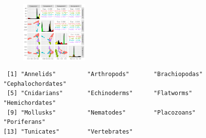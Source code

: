 \documentclass[
  letterpaper,
  DIV=11,
  numbers=noendperiod]{scrreprt}
\newenvironment{Shaded}{\begin{snugshade}}{\end{snugshade}}
\newcommand{\FunctionTok}[1]{\textcolor[rgb]{0.28,0.35,0.67}{#1}}
\newcommand{\NormalTok}[1]{\textcolor[rgb]{0.00,0.23,0.31}{#1}}
\newcommand{\OtherTok}[1]{\textcolor[rgb]{0.00,0.23,0.31}{#1}}
\newcommand{\SpecialCharTok}[1]{\textcolor[rgb]{0.37,0.37,0.37}{#1}}
\newcommand{\StringTok}[1]{\textcolor[rgb]{0.13,0.47,0.30}{#1}}
\begin{document}
\begin{figure}[H]

{\centering \includegraphics[width=0.3\textwidth,height=\textheight]{index_files/figure-pdf/unnamed-chunk-37-1.pdf}

}

\end{figure}

\begin{Shaded}
\end{Shaded}

\begin{verbatim}
 [1] "Annelids"         "Arthropods"       "Brachiopodas"     "Cephalochordates"
 [5] "Cnidarians"       "Echinoderms"      "Flatworms"        "Hemichordates"   
 [9] "Mollusks"         "Nematodes"        "Placozoans"       "Poriferans"      
[13] "Tunicates"        "Vertebrates"     
\end{verbatim}
\end{document}
